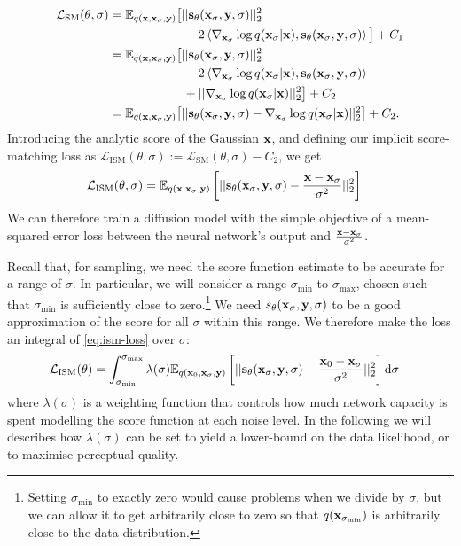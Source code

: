 \begin{align}
    \mathcal{L}_\text{SM}(\theta, \sigma) &= \mathbb{E}_{q({\mathbf{x}}, {\mathbf{x}}_\sigma, {\mathbf{y}})} \big[ 
    || {\mathbf{s}}_\theta({\mathbf{x}}_\sigma, {\mathbf{y}}, \sigma) ||_2^2
    \nonumber\\ &\qquad\qquad\qquad
    - 2 \left\langle \nabla_{{\mathbf{x}}_\sigma} \log q({\mathbf{x}}_\sigma|{\mathbf{x}}), {\mathbf{s}}_\theta({\mathbf{x}}_\sigma, {\mathbf{y}}, \sigma) \right\rangle \big] + C_1 \\
    &= \mathbb{E}_{q({\mathbf{x}}, {\mathbf{x}}_\sigma, {\mathbf{y}})} \big[ 
    || {\mathbf{s}}_\theta({\mathbf{x}}_\sigma, {\mathbf{y}}, \sigma) ||_2^2
    \nonumber\\ &\qquad\qquad\qquad
    - 2 \left\langle \nabla_{{\mathbf{x}}_\sigma} \log q({\mathbf{x}}_\sigma|{\mathbf{x}}), {\mathbf{s}}_\theta({\mathbf{x}}_\sigma, {\mathbf{y}}, \sigma) \right\rangle
    \nonumber\\ &\qquad\qquad\qquad
    + || \nabla_{{\mathbf{x}}_\sigma} \log q({\mathbf{x}}_\sigma|{\mathbf{x}}) ||_2^2 \big] + C_2 \\
    &= \mathbb{E}_{q({\mathbf{x}}, {\mathbf{x}}_\sigma, {\mathbf{y}})} \big[ 
    || {\mathbf{s}}_\theta({\mathbf{x}}_\sigma, {\mathbf{y}}, \sigma) - \nabla_{{\mathbf{x}}_\sigma} \log q({\mathbf{x}}_\sigma|{\mathbf{x}}) ||_2^2 \big] + C_2.
\end{align}
Introducing the analytic score of the Gaussian ${\mathbf{x}}$, and defining our implicit score-matching loss as $\mathcal{L}_\text{ISM}(\theta, \sigma) := \mathcal{L}_\text{SM}(\theta, \sigma) - C_2$, we get
\begin{align} \label{eq:ism-loss}
    \mathcal{L}_\text{ISM}(\theta, \sigma) &= \mathbb{E}_{q({\mathbf{x}}, {\mathbf{x}}_\sigma, {\mathbf{y}})} \left[ 
    || {\mathbf{s}}_\theta({\mathbf{x}}_\sigma, {\mathbf{y}}, \sigma) - \frac{{\mathbf{x}}-{\mathbf{x}}_\sigma}{\sigma^2} ||_2^2 \right]
\end{align}
We can therefore train a diffusion model with the simple objective of a mean-squared error loss between the neural network's output and $\frac{{\mathbf{x}}-{\mathbf{x}}_\sigma}{\sigma^2}$.

Recall that, for sampling, we need the score function estimate to be accurate for a range of $\sigma$. In particular, we will consider a range $\sigma_\text{min}$ to $\sigma_\text{max}$, chosen such that $\sigma_\text{min}$ is sufficiently close to zero.\footnote{Setting $\sigma_\text{min}$ to exactly zero would cause problems when we divide by $\sigma$, but we can allow it to get arbitrarily close to zero so that $q({\mathbf{x}}_{\sigma_\text{min}})$ is arbitrarily close to the data distribution.} We need $s_\theta({\mathbf{x}}_\sigma, {\mathbf{y}}, \sigma)$ to be a good approximation of the score for all $\sigma$ within this range. We therefore make the loss an integral of \cref{eq:ism-loss} over $\sigma$:
\begin{align} \label{eq:diffusion-loss-all-sigma}
    \mathcal{L}_\text{ISM}(\theta) &= \int_{\sigma_\text{min}}^{\sigma_\text{max}} \lambda(\sigma) \mathbb{E}_{q({\mathbf{x}}_0, {\mathbf{x}}_\sigma, {\mathbf{y}})} \left[ 
    || {\mathbf{s}}_\theta({\mathbf{x}}_\sigma, {\mathbf{y}}, \sigma) - \frac{{\mathbf{x}}_0-{\mathbf{x}}_\sigma}{\sigma^2} ||_2^2 \right] \mathrm{d}\sigma
\end{align}
where $\lambda(\sigma)$ is a weighting function that controls how much network capacity is spent modelling the score function at each noise level. In the following we will describes how $\lambda(\sigma)$ can be set to yield a lower-bound on the data likelihood, or to maximise perceptual quality.

